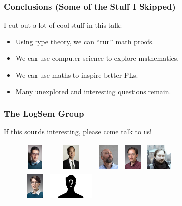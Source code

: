 \documentclass[usenames,dvipsnames,aspectratio=169,12pt]{beamer}
\begin{document}
\begin{frame}
  \frametitle{Conclusions (Some of the Stuff I Skipped)}
  I cut out a lot of cool stuff in this talk:
  \begin{itemize}
  \item Using type theory, we can ``run'' math proofs.
  \item We can use computer science to explore mathematics.
  \item We can use maths to inspire better PLs.
  \item Many unexplored and interesting questions remain.
  \end{itemize}
\end{frame}

\begin{frame}
  \frametitle{The LogSem Group}
  If this sounds interesting, please come talk to us!
  \begin{figure}
    \begin{tabular}{ccccc}
    {\includegraphics[height = 0.5in]{aslan.jpg}}      &
    {\includegraphics[height = 0.5in]{lars.jpg}}       &
    {\includegraphics[height = 0.5in]{bas.jpg}}        &
    {\includegraphics[height = 0.5in]{jaco.jpg}}       &
    {\includegraphics[height = 0.5in]{danil.jpg}}     \\
    {\includegraphics[height = 0.5in]{sabine.jpg}}     &
    {\includegraphics[height = 0.5in]{alix.png}}       &

\end{tabular}
\end{figure}
\end{frame}
\end{document}
